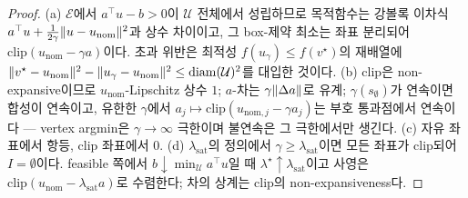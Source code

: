 \documentclass[11pt]{article}
\theoremstyle{plain}
\theoremstyle{definition}
\theoremstyle{remark}
\DeclarePairedDelimiter{\norm}{\lVert}{\rVert}
\newcommand{\calU}{\mathcal{U}}
\begin{document}
\begin{proof}
(a) $\mathcal E$에서 $a^\top u-b>0$이 $\calU$ 전체에서 성립하므로 목적함수는 강볼록 이차식
$a^\top u+\tfrac{1}{2\gamma}\norm{u-u_{\mathrm{nom}}}^2$과 상수 차이이고, 그 box-제약 최소는
좌표 분리되어 $\mathrm{clip}(u_{\mathrm{nom}}-\gamma a)$이다. 초과 위반은 최적성
$f(u_\gamma)\le f(v^\star)$의 재배열에 $\norm{v^\star-u_{\mathrm{nom}}}^2
-\norm{u_\gamma-u_{\mathrm{nom}}}^2\le\operatorname{diam}(\calU)^2$를 대입한 것이다.
(b) clip은 non-expansive이므로 $u_{\mathrm{nom}}$-Lipschitz 상수 $1$; $a$-차는
$\gamma\norm{\Delta a}$로 유계; $\gamma(s_\emptyset)$가 연속이면 합성이 연속이고, 유한한
$\gamma$에서 $a_j\mapsto\mathrm{clip}(u_{\mathrm{nom},j}-\gamma a_j)$는 부호 통과점에서
연속이다 --- vertex argmin은 $\gamma\to\infty$ 극한이며 불연속은 그 극한에서만 생긴다.
(c) 자유 좌표에서 항등, clip 좌표에서 $0$. (d) $\lambda_{\mathrm{sat}}$의 정의에서
$\gamma\ge\lambda_{\mathrm{sat}}$이면 모든 좌표가 clip되어 $I=\emptyset$이다. feasible 쪽에서
$b\downarrow\min_\calU a^\top u$일 때 $\lambda^\star\uparrow\lambda_{\mathrm{sat}}$이고 사영은
$\mathrm{clip}(u_{\mathrm{nom}}-\lambda_{\mathrm{sat}}a)$로 수렴한다; 차의 상계는 clip의
non-expansiveness다.
\end{proof}
\end{document}
